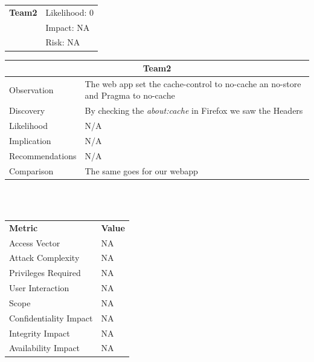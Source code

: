 \documentclass[headsepline,footsepline,footinclude=false,oneside,fontsize=11pt,paper=a4,listof=totoc,bibliography=totoc]{scrbook} %
\begin{document}
\begin{tabular}{cR{12cm}}
	\textbf{Team2} & Likelihood: 0\\& Impact: NA\\& Risk: NA
\end{tabular}

\begin{tabular}{ l|p{11cm}  }
	\hline
	\multicolumn{2}{c}{\textbf{Team2}} \\
	\hline
	Observation & The web app set the cache-control to no-cache an no-store and Pragma to no-cache\\
	Discovery & By checking the \textit{about:cache} in Firefox we saw the Headers\\
	Likelihood &  N/A \\
	Implication & N/A \\
	Recommendations &  N/A\\
	Comparison & The same goes for our webapp \\
	\hline
\end{tabular}
\\
\vspace{0.5cm}
\\
\begin{center}
	\begin{tabular}{ll}
		\rowcolor[HTML]{34CDF9}
		{\color[HTML]{ECF4FF} \textbf{Metric}}        & {\color[HTML]{ECF4FF} \textbf{Value}} \\
		\rowcolor[HTML]{BBDAFF}
		{\color[HTML]{333333} Access Vector}          & {\color[HTML]{333333} } NA              \\
		\rowcolor[HTML]{ECF4FF}
		{\color[HTML]{333333} Attack Complexity}      & {\color[HTML]{333333} } NA              \\
		\rowcolor[HTML]{BBDAFF}
		{\color[HTML]{333333} Privileges Required}    & {\color[HTML]{333333} } NA              \\
		\rowcolor[HTML]{ECF4FF}
		{\color[HTML]{333333} User Interaction}       & {\color[HTML]{333333} } NA              \\
		\rowcolor[HTML]{BBDAFF}
		{\color[HTML]{333333} Scope}                  & {\color[HTML]{333333} } NA              \\
		\rowcolor[HTML]{ECF4FF}
		{\color[HTML]{333333} Confidentiality Impact} & {\color[HTML]{333333} } NA              \\
		\rowcolor[HTML]{BBDAFF}
		{\color[HTML]{333333} Integrity Impact}       & {\color[HTML]{333333} } NA              \\
		\rowcolor[HTML]{ECF4FF}
		{\color[HTML]{333333} Availability Impact}    & {\color[HTML]{333333} } NA
	\end{tabular}
\end{center}
\end{document}
